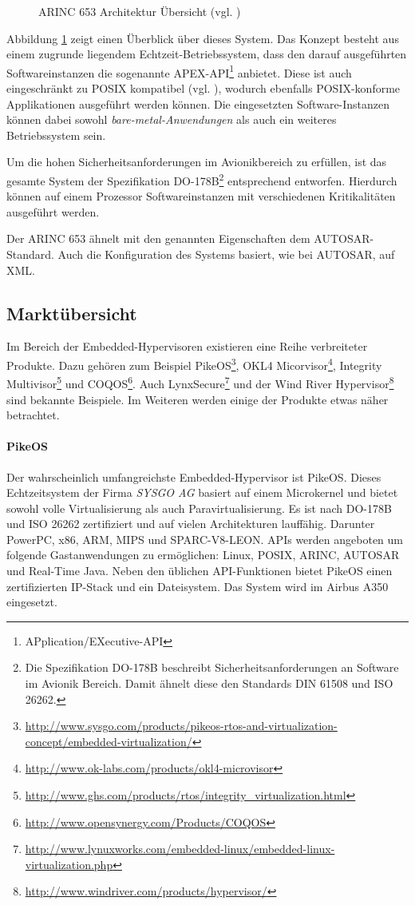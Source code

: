 \documentclass[
  a4paper,					    %
  twoside,
  DIV=calc,     				%
  bibliography=totoc,
  cleardoublepage=empty,
  ngerman,     					%
  final       					%
]{scrbook}
\begin{document}
\begin{figure}[tb]
    \centering
    
    \caption[ARINC 653 Architektur Übersicht]{ARINC 653 Architektur Übersicht (vgl. \cite{arinc653_wr})}
    \label{fig:arinc_653}
\end{figure}

Abbildung \ref{fig:arinc_653} zeigt einen Überblick über dieses System. Das Konzept besteht aus einem zugrunde liegendem Echtzeit-Betriebssystem, dass den darauf ausgeführten Softwareinstanzen die sogenannte APEX-API\footnote{APplication/EXecutive-API} anbietet. Diese ist auch eingeschränkt zu POSIX kompatibel (vgl. \cite{wiki:arinc_653}), wodurch ebenfalls POSIX-konforme Applikationen ausgeführt werden können. Die eingesetzten Software-Instanzen können dabei sowohl \emph{bare-metal-Anwendungen} als auch ein weiteres Betriebssystem sein.

Um die hohen Sicherheitsanforderungen im Avionikbereich zu erfüllen, ist das gesamte System der Spezifikation DO-178B\footnote{Die Spezifikation DO-178B beschreibt Sicherheitsanforderungen an Software im Avionik Bereich. Damit ähnelt diese den Standards DIN 61508 und ISO 26262.} entsprechend entworfen. Hierdurch können auf einem Prozessor Softwareinstanzen mit verschiedenen Kritikalitäten ausgeführt werden. 

Der ARINC 653 ähnelt mit den genannten Eigenschaften dem AUTOSAR-Standard. Auch die Konfiguration des Systems basiert, wie bei AUTOSAR, auf XML.


\subsection{Marktübersicht}
Im Bereich der Embedded-Hypervisoren existieren eine Reihe verbreiteter Produkte. Dazu gehören zum Beispiel PikeOS\footnote{\url{http://www.sysgo.com/products/pikeos-rtos-and-virtualization-concept/embedded-virtualization/}}, OKL4 Micorvisor\footnote{\url{http://www.ok-labs.com/products/okl4-microvisor}}, Integrity Multivisor\footnote{\url{http://www.ghs.com/products/rtos/integrity_virtualization.html}} und COQOS\footnote{\url{http://www.opensynergy.com/Products/COQOS}}. Auch LynxSecure\footnote{\url{http://www.lynuxworks.com/embedded-linux/embedded-linux-virtualization.php}} und der Wind River Hypervisor\footnote{\url{http://www.windriver.com/products/hypervisor/}} sind bekannte Beispiele. Im Weiteren werden einige der Produkte etwas näher betrachtet.

\paragraph{PikeOS}
Der wahrscheinlich umfangreichste Embedded-Hypervisor ist PikeOS. Dieses Echtzeitsystem der Firma \emph{SYSGO AG} basiert auf einem Microkernel und bietet sowohl volle Virtualisierung als auch Paravirtualisierung. Es ist nach DO-178B und ISO 26262 zertifiziert und auf vielen Architekturen lauffähig. Darunter PowerPC, x86, ARM, MIPS und SPARC-V8-LEON. APIs werden angeboten um folgende Gastanwendungen zu ermöglichen: Linux, POSIX, ARINC, AUTOSAR und Real-Time Java. Neben den üblichen API-Funktionen bietet PikeOS einen zertifizierten IP-Stack und ein Dateisystem. Das System wird im Airbus A350 eingesetzt.
\end{document}
